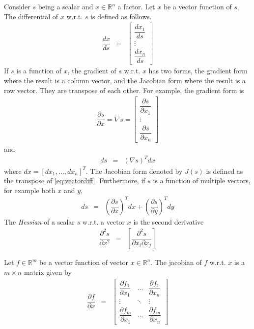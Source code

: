 Consider $s$ being a scalar and $x\in\mathbb{R}^n$ a factor. Let $x$ be a vector function of $s$. The differential of $x$ w.r.t. $s$ is defined as follows.
\begin{eqnarray}
  \dfrac{dx}{ds} &=& \left[\begin{array}{c}
                             \dfrac{dx_1}{ds} \\
                             \vdots \\
                             \dfrac{dx_n}{ds}
                           \end{array}\right] \nonumber
\end{eqnarray}
If $s$ is a function of $x$, the gradient of $s$ w.r.t. $x$ has two forms, the gradient form where the result is a column vector, and the Jacobian form where the result is a row vector. They are transpose of each other. For example, the gradient form is
\begin{eqnarray}
   \dfrac{\partial s}{\partial x} = \nabla s
  = \left[\begin{array}{c}
           \dfrac{\partial s}{\partial x_1} \\
           \vdots \\
           \dfrac{\partial s}{\partial x_n}
           \end{array}\right] \label{eq:vectordiff}
\end{eqnarray}
and
\begin{eqnarray}
ds &=& \left(\nabla s\right)^Tdx \nonumber
\end{eqnarray}
where $dx = [dx_1, \ldots, dx_n]^T$. The Jacobian form denoted by $J(s)$ is defined as the transpose of \eqref{eq:vectordiff}. Furthermore, if $s$ is a function of multiple vectors, for example both $x$ and $y$,
\begin{eqnarray}
ds &=& \left(\dfrac{\partial s}{\partial x}\right)^Tdx + \left(\dfrac{\partial s}{\partial y}\right)^Tdy \nonumber
\end{eqnarray}
The \textit{Hessian} of a scalar $s$ w.r.t. a vector $x$ is the second derivative
\begin{eqnarray}
  \dfrac{\partial^2s}{\partial x^2} &=& \left[\dfrac{\partial^2s}{\partial x_i \partial x_j}\right] \nonumber
\end{eqnarray}

Let $f\in\mathbb{R}^{m}$ be a vector function of vector $x\in\mathbb{R}^{n}$. The jacobian of $f$ w.r.t. $x$ is a $m\times n$ matrix given by
\begin{eqnarray}
  \dfrac{\partial f}{\partial x} &=& \left[\begin{array}{ccc}
                                             \dfrac{\partial f_1}{\partial x_1} & \ldots & \dfrac{\partial f_1}{\partial x_n} \\
                                             \vdots & \ddots & \vdots \\
                                             \dfrac{\partial f_m}{\partial x_1} & \ldots & \dfrac{\partial f_m}{\partial x_n}
                                           \end{array}\right] \nonumber
\end{eqnarray}

